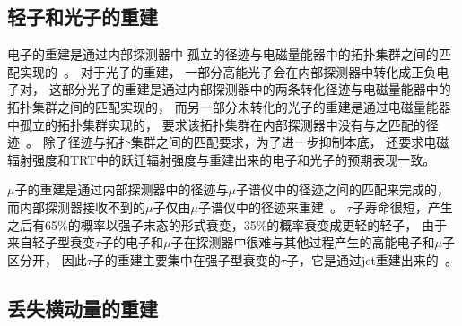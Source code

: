 
\subsection{轻子和光子的重建}
\label{sec:LEPTON}

电子的重建是通过内部探测器中
孤立的径迹与电磁量能器中的拓扑集群之间的匹配实现的~\cite{LEPTON1,LEPTON2,LEPTON3}。
对于光子的重建，
一部分高能光子会在内部探测器中转化成正负电子对，%
这部分光子的重建是通过内部探测器中的两条转化径迹与电磁量能器中的拓扑集群之间的匹配实现的，
而另一部分未转化的光子的重建是通过电磁量能器中孤立的拓扑集群实现的，
要求该拓扑集群在内部探测器中没有与之匹配的径迹~\cite{LEPTON2,LEPTON3}。
除了径迹与拓扑集群之间的匹配要求，为了进一步抑制本底，
还要求电磁辐射强度和TRT中的跃迁辐射强度与重建出来的电子和光子的预期表现一致。

$\mu$子的重建是通过内部探测器中的径迹与$\mu$子谱仪中的径迹之间的匹配来完成的，
而内部探测器接收不到的$\mu$子仅由$\mu$子谱仪中的径迹来重建~\cite{LEPTON4,LEPTON5}。
$\tau$子寿命很短，产生之后有65\%的概率以强子末态的形式衰变，35\%的概率衰变成更轻的轻子，
由于
来自轻子型衰变$\tau$子的电子和$\mu$子在探测器中很难与其他过程产生的高能电子和$\mu$子区分开，
因此$\tau$子的重建主要集中在强子型衰变的$\tau$子，它是通过jet重建出来的~\cite{LEPTON6,LEPTON7,LEPTON8}。


\subsection{丢失横动量的重建}
\label{sec:MISSET}


